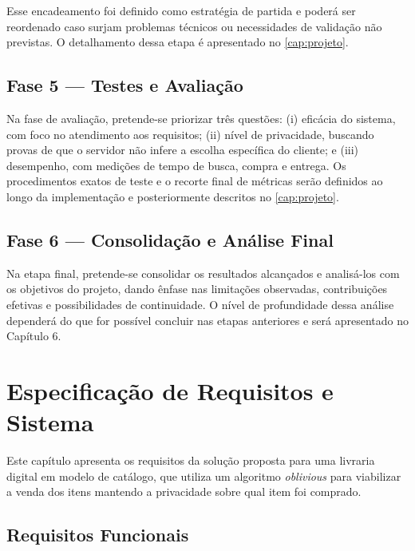 \documentclass[12pt, oneside, a4paper, english, brazil]{abntex2}
\begin{document}
Esse encadeamento foi definido como estratégia de partida e poderá ser
reordenado caso surjam problemas técnicos ou necessidades de validação não
previstas. O detalhamento dessa etapa é apresentado no \autoref{cap:projeto}.

\section{Fase 5 --- Testes e Avaliação}

Na fase de avaliação, pretende-se priorizar três questões: (i) eficácia do
sistema, com foco no atendimento aos requisitos; (ii) nível de privacidade,
buscando provas de que o servidor não infere a escolha específica do cliente;
e (iii) desempenho, com medições de tempo de busca, compra e entrega. Os
procedimentos exatos de teste e o recorte final de métricas serão definidos ao
longo da implementação e posteriormente descritos no \autoref{cap:projeto}.

\section{Fase 6 --- Consolidação e Análise Final}

Na etapa final, pretende-se consolidar os resultados alcançados e analisá-los
com os objetivos do projeto, dando ênfase nas limitações observadas,
contribuições efetivas e possibilidades de continuidade. O nível de
profundidade dessa análise dependerá do que for possível concluir nas etapas
anteriores e será apresentado no Capítulo 6.

\chapter{Especificação de Requisitos e Sistema}\label{cap:requisitos}

Este capítulo apresenta os requisitos da solução proposta para uma livraria
digital em modelo de catálogo, que utiliza um algoritmo \emph{oblivious} para
viabilizar a venda dos itens mantendo a privacidade sobre qual item foi
comprado.

\section{Requisitos Funcionais}
\end{document}
